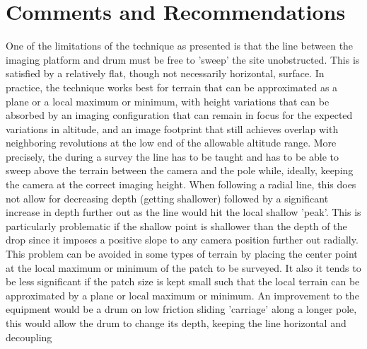 \section{Comments and Recommendations}


One of the limitations of the technique as presented is that the line between the imaging platform and drum must be free to 'sweep' the site unobstructed. This is satisfied by a relatively flat, though not necessarily horizontal, surface. In practice, the technique works best for terrain that can be approximated as a plane or a local maximum or minimum, with height variations that can be absorbed by an imaging configuration that can remain in focus for the expected variations in altitude, and an image footprint that still achieves overlap with neighboring revolutions at the low end of the allowable altitude range.
More precisely, the during a survey the line has to be taught and has to be able to sweep above the terrain between the camera and the pole while, ideally, keeping the camera at the correct imaging height. When following a radial line, this does not allow for decreasing depth (getting shallower) followed by a significant increase in depth further out as the line would hit the local shallow 'peak'. This is particularly problematic if the shallow point is shallower than the depth of the drop since it imposes a positive slope to any camera position further out radially. This problem can be avoided in some types of terrain by placing the center point at the local maximum or minimum of the patch to be surveyed. It also it tends to be less significant if the patch size is kept small such that the local terrain can be approximated by a plane or local maximum or minimum. An improvement to the equipment would be a drum on low friction sliding 'carriage' along a longer pole, this would allow the drum to change its depth, keeping the line horizontal and decoupling 